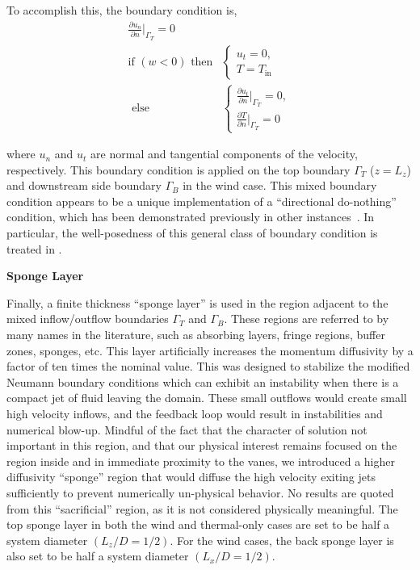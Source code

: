 To accomplish this, the boundary condition is,
\begin{align}
  \frac{\partial u_n}{\partial n}\bigg|_{\Gamma_T} = 0 \\
  \text{if } (w<0) \text{ then}& \begin{cases}
    u_t = 0,\\
    T = T_{\text{in}}
  \end{cases} \\
  \text{ else}& \begin{cases}
    \frac{\partial u_t}{\partial n}\bigg|_{\Gamma_T} = 0, \\  
    \frac{\partial T}{\partial n}\bigg|_{\Gamma_T} = 0
  \end{cases}
\end{align}

where $u_n$ and $u_t$ are normal and tangential components of the velocity, 
respectively. This boundary condition is applied on the top boundary
$\Gamma_T$ ($z=L_z$) and downstream side boundary  $\Gamma_B$ in the
wind case. This mixed boundary condition appears to be a unique
implementation of a ``directional do-nothing'' condition, which has been
demonstrated previously in other
instances~\cite{braack2014directional,feistauer2006non}. In particular,
the well-posedness of this general class of boundary condition is
treated in \cite{bruneau1996new}.  

\textbf{Sponge Layer} 

Finally, a finite thickness ``sponge layer'' is used in the region adjacent 
to the mixed inflow/outflow boundaries $\Gamma_T$ and $\Gamma_B$.
These regions are referred to by many names in the
literature\cite{doi:10.1146/annurev.fluid.36.050802.121930}, such as
absorbing layers, fringe regions, buffer zones, sponges,
etc. 
This layer artificially increases the momentum diffusivity by
a factor of ten times the nominal value. This was designed to stabilize
the modified Neumann boundary conditions which can exhibit an instability
when there is a compact jet of fluid leaving the domain. 
These small outflows would create small high velocity inflows, and the
feedback loop would result in instabilities and numerical
blow-up. Mindful of the fact that the character of solution not
important in this region, and that our physical interest remains focused
on the region inside and in immediate proximity to the vanes, we
introduced a higher diffusivity ``sponge'' region that would diffuse the
high velocity exiting jets sufficiently to prevent numerically
un-physical behavior. No results are quoted from this ``sacrificial''
region, as it is not considered physically meaningful. The top sponge
layer in both the wind and thermal-only cases are set to be half a
system diameter $(L_z/D = 1/2)$. For the wind cases, the back sponge
layer is also set to be half a system diameter $(L_x/D = 1/2)$. 


